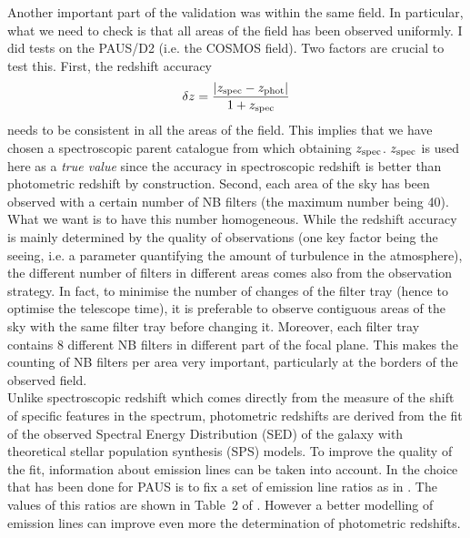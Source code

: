 \documentclass[11pt]{article}
\begin{document}
Another important part of the validation was within the same field. In particular, what we need to check is that all areas of the field has been observed uniformly. I did tests on the PAUS/D2 (i.e. the COSMOS field). Two factors are crucial to test this. First, the redshift accuracy $$\delta z =  \frac{\lvert z_{\rm{spec}}-z_{\rm{phot}}\rvert}{1+z_{\rm{spec}}}$$ needs to be consistent in all the areas of the field. This implies that we have chosen a spectroscopic parent catalogue from which obtaining $z_{\rm{spec}}$. $z_{\rm{spec}}$ is used here as a \textit{true value} since the accuracy in spectroscopic redshift is better than photometric redshift by construction. Second, each area of the sky has been observed with a certain number of NB filters (the maximum number being 40). What we want is to have this number homogeneous. While the redshift accuracy is mainly determined by the quality of observations (one key factor being the seeing, i.e. a parameter quantifying the amount of turbulence in the atmosphere), the different number of filters in different areas comes also from the observation strategy. In fact, to minimise the number of changes of the filter tray (hence to optimise the telescope time), it is preferable to observe contiguous areas of the sky with the same filter tray before changing it. Moreover, each filter tray contains 8 different NB filters in different part of the focal plane. This makes the counting of NB filters per area very important, particularly at the borders of the observed field. \\

Unlike spectroscopic redshift which comes directly from the measure of the shift of specific features in the spectrum, photometric redshifts are derived from the fit of the observed Spectral Energy Distribution (SED) of the galaxy with theoretical stellar population synthesis (SPS) models. To improve the quality of the fit, information about emission lines can be taken into account. In \cite{eriksen18} the choice that has been done for PAUS is to fix a set of emission line ratios as in \cite{ilbert09}. The values of this ratios are shown in Table~2 of \cite{eriksen18}.
However a better modelling of emission lines can improve even more the determination of photometric redshifts.
\end{document}
